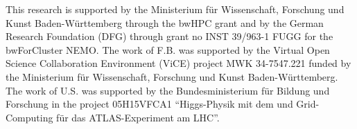%
%


\begin{acknowledgements}
This research is supported by the Ministerium für Wissenschaft, Forschung und
Kunst Baden-Württemberg through the bwHPC grant
and by the German Research Foundation (DFG) through grant no INST
39/963-1 FUGG for the bwForCluster NEMO.
The work of F.B. was supported by the Virtual Open Science
Collaboration Environment (ViCE) project MWK 34-7547.221 funded by the Ministerium für Wissenschaft, Forschung und
Kunst Baden-Württemberg.
The work of U.S. was supported by  the Bundesministerium für Bildung und Forschung in the project 05H15VFCA1 
    “Higgs-Physik mit dem und Grid-Computing für das ATLAS-Experiment am LHC”. 
\end{acknowledgements}


